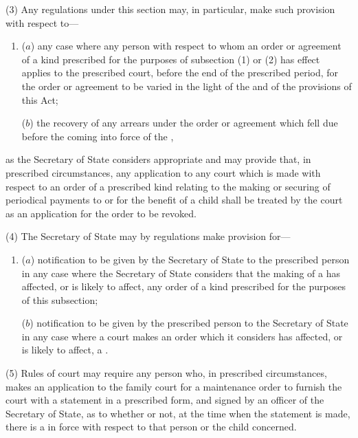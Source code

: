 \documentclass[12pt,a4paper]{article}
\begin{document}
(3)
Any regulations under this section may, in particular, make such provision
with respect to---
\begin{enumerate}\item[]
($a$)
any case where any person with respect to whom an order or agreement
of a kind prescribed for the purposes of subsection (1) or (2) has effect
applies to the prescribed court, before the end of the prescribed period,
for the order or agreement to be varied in the light of the 
and of the provisions of this Act;

($b$)
the recovery of any arrears under the order or agreement which fell due
before the coming into force of the ,
\end{enumerate}
as the Secretary of State considers appropriate and may provide that, in prescribed
circumstances, any application to any court which is made with respect to an order
of a prescribed kind relating to the making or securing of periodical payments to
or for the benefit of a child shall be treated by the court as an application for the
order to be revoked.

(4)
The Secretary of State may by regulations make provision for---
\begin{enumerate}\item[]
($a$)
notification to be given by 
the 
Secretary of State to the prescribed person
in any case where the Secretary of State considers that the making of a
has affected, or is likely
to affect, any order of a kind prescribed for the purposes of this subsection;

($b$)
notification to be given by the prescribed person to the Secretary of State
in any case where a court makes an order which it considers has affected,
or is likely to affect, a .
\end{enumerate}

(5) Rules 
of court may require   %
any person who, in prescribed circumstances, makes
an application to 
the family court     %
for a maintenance order to furnish the court
with a statement in a prescribed form, and signed by an officer of the Secretary of
State, as to whether or not, at the time when the statement is made, there is a
in force with respect to that person
or the child concerned.
\end{document}
